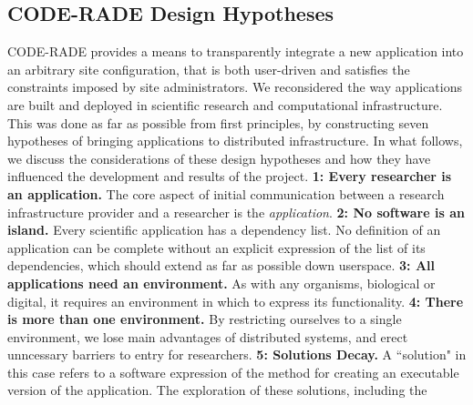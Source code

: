\documentclass[a4paper]{jpconf}
\begin{document}
	\subsection{CODE-RADE Design Hypotheses}
    CODE-RADE provides a means to transparently integrate a new application into an arbitrary site
    configuration, that is both user-driven and satisfies the constraints imposed by site
    administrators. We reconsidered the way applications are built and deployed in scientific
    research and computational infrastructure.
    This was done as far as possible from first principles, by constructing seven hypotheses of
    bringing applications to distributed infrastructure. In what follows, we discuss the
    considerations  of these design hypotheses and how they have influenced the development and
    results of the project.
    {\bf 1: Every researcher is an application.} The core aspect of initial communication between a research infrastructure provider and a
            researcher is the {\it application}. %
    {\bf 2: No software is an island.}
        Every scientific application has a dependency list. No definition of an application can be
            complete without an explicit expression of the list of its dependencies, which should
            extend as far as possible down userspace.
        {\bf 3: All applications need an environment.}
        As with any organisms, biological or digital, it requires an environment in which to 
            express its functionality.%
        { \bf 4: There is more than one environment.}
        By restricting ourselves to a single environment, we lose main advantages of distributed
            systems, and erect unncessary barriers to entry for researchers. %
        {\bf 5: Solutions Decay.}
        A ``solution" in this case refers to a software expression of the method for creating an
            executable version of the application. The exploration of these solutions, including the
\end{document}
